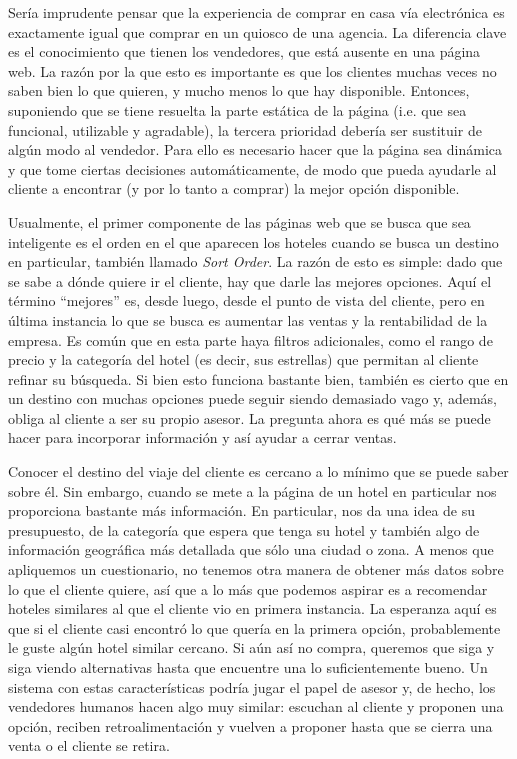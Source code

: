 \documentclass[12pt]{report}
\begin{document}
Sería imprudente pensar que la experiencia de comprar en casa vía electrónica es exactamente igual que comprar en un quiosco de una agencia. La diferencia clave es el conocimiento que tienen los vendedores, que está ausente en una página web. La razón por la que esto es importante es que los clientes muchas veces no saben bien lo que quieren, y mucho menos lo que hay disponible. Entonces, suponiendo que se tiene resuelta la parte estática de la página (i.e. que sea funcional, utilizable y agradable), la tercera prioridad debería ser sustituir de algún modo al vendedor. Para ello es necesario hacer que la página sea dinámica y que tome ciertas decisiones automáticamente, de modo que pueda ayudarle al cliente a encontrar (y por lo tanto a comprar) la mejor opción disponible.

Usualmente, el primer componente de las páginas web que se busca que sea inteligente es el orden en el que aparecen los hoteles cuando se busca un destino en particular, también llamado \emph{Sort Order}. La razón de esto es simple: dado que se sabe a dónde quiere ir el cliente, hay que darle las mejores opciones. Aquí el término ``mejores'' es, desde luego, desde el punto de vista del cliente, pero en última instancia lo que se busca es aumentar las ventas y la rentabilidad de la empresa. Es común que en esta parte haya filtros adicionales, como el rango de precio y la categoría del hotel (es decir, sus estrellas) que permitan al cliente refinar su búsqueda. Si bien esto funciona bastante bien, también es cierto que en un destino con muchas opciones puede seguir siendo demasiado vago y, además, obliga al cliente a ser su propio asesor. La pregunta ahora es qué más se puede hacer para incorporar información y así ayudar a cerrar ventas.

Conocer el destino del viaje del cliente es cercano a lo mínimo que se puede saber sobre él. Sin embargo, cuando se mete a la página de un hotel en particular nos proporciona bastante más información. En particular, nos da una idea de su presupuesto, de la categoría que espera que tenga su hotel y también algo de información geográfica más detallada que sólo una ciudad o zona. A menos que apliquemos un cuestionario, no tenemos otra manera de obtener más datos sobre lo que el cliente quiere, así que a lo más que podemos aspirar es a recomendar hoteles similares al que el cliente vio en primera instancia. La esperanza aquí es que si el cliente casi encontró lo que quería en la primera opción, probablemente le guste algún hotel similar cercano. Si aún así no compra, queremos que siga y siga viendo alternativas hasta que encuentre una lo suficientemente bueno. Un sistema con estas características podría jugar el papel de asesor y, de hecho, los vendedores humanos hacen algo muy similar: escuchan al cliente y proponen una opción, reciben retroalimentación y vuelven a proponer hasta que se cierra una venta o el cliente se retira.
\end{document}
